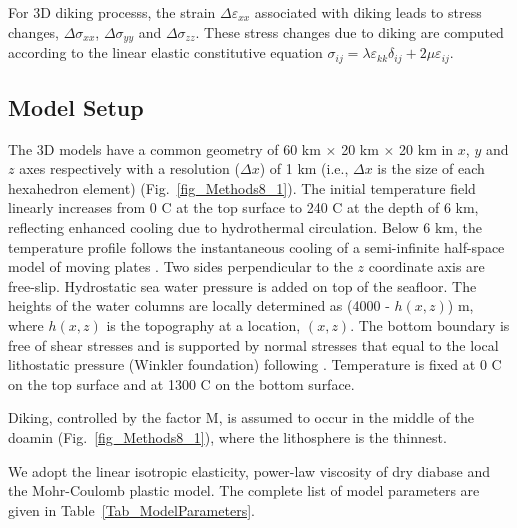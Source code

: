 \documentclass[draft,gc]{agutex}
\begin{document}
\begin{article}
For 3D diking processs, the strain $\Delta\varepsilon_{xx}$ associated with diking leads to stress changes, $\Delta\sigma_{xx}$, $\Delta\sigma_{yy}$ and $\Delta\sigma_{zz}$. These stress changes due to diking are computed according to the linear elastic constitutive equation $\sigma_{ij}=\lambda\varepsilon_{kk}\delta_{ij}+2\mu\varepsilon_{ij}$.

\subsection{Model Setup}
The 3D models have a common geometry of 60 km $\times$ 20 km $\times$ 20 km in $x$, $y$ and $z$ axes respectively with a resolution ($\Delta x$) of 1 km (i.e., $\Delta x$ is the size of each hexahedron element) (Fig.~\ref{fig_Methods8_1}). The initial temperature field linearly increases from 0 \degree C at the top surface to 240 \degree C at the depth of 6 km, reflecting enhanced cooling due to hydrothermal circulation. Below 6 km, the temperature profile follows the instantaneous cooling of a semi-infinite half-space model of moving plates \citep[e.g.,][]{Turcotte2002}. Two sides perpendicular to the $z$ coordinate axis are free-slip. Hydrostatic sea water pressure is added on top of the seafloor. The heights of the water columns are locally determined as (4000 - $h(x,z)$) m, where $h(x,z)$ is the topography at a location, $(x,z)$. The bottom boundary is free of shear stresses and is supported by normal stresses that equal to the local lithostatic pressure (Winkler foundation) following \citet{Buck2005}. Temperature is fixed at 0 \degree C on the top surface and at 1300 \degree C on the bottom surface.

Diking, controlled by the factor M, is assumed to occur in the middle of the doamin (Fig.~\ref{fig_Methods8_1}), where the lithosphere is the thinnest.

We adopt the linear isotropic elasticity, power-law viscosity of dry diabase \citep[e.g.,][]{Kirby1987, Buck2005} and the Mohr-Coulomb plastic model. The complete list of model parameters are given in Table~\ref{Tab_ModelParameters}.


\end{article}
\end{document}
